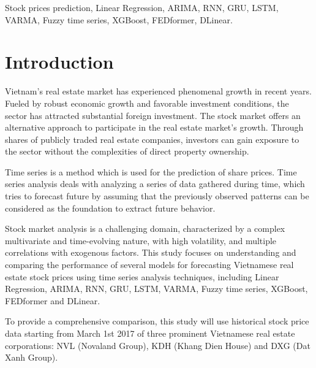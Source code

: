 \documentclass[conference]{IEEEtran}
\begin{document}
\begin{IEEEkeywords}
Stock prices prediction, Linear Regression, ARIMA, RNN, GRU, LSTM, VARMA, Fuzzy time series, XGBoost, FEDformer, DLinear.
\end{IEEEkeywords}

\section{Introduction}
Vietnam's real estate market has experienced phenomenal growth in recent years. Fueled by robust economic growth and favorable investment conditions, the sector has attracted substantial foreign investment. The stock market offers an alternative approach to participate in the real estate market's growth. Through shares of publicly traded real estate companies, investors can gain exposure to the sector without the complexities of direct property ownership. \par
Time series is a method which is used for the prediction of share prices. Time series analysis deals with analyzing a series of data gathered during time, which tries to forecast future by assuming that the previously observed patterns can be considered as the foundation to extract future behavior. \par
Stock market analysis is a challenging domain, characterized by a complex multivariate and time-evolving nature, with high volatility, and multiple correlations with exogenous factors. This study focuses on understanding and comparing the performance of several models for forecasting Vietnamese real estate stock prices using time series analysis techniques, including Linear Regression, ARIMA, RNN, GRU, LSTM, VARMA, Fuzzy time series, XGBoost, FEDformer and DLinear. \par
To provide a comprehensive comparison, this study will use historical stock price data starting from March 1st 2017 of three prominent Vietnamese real estate corporations: NVL (Novaland Group), KDH (Khang Dien House) and DXG (Dat Xanh Group).
\end{document}
